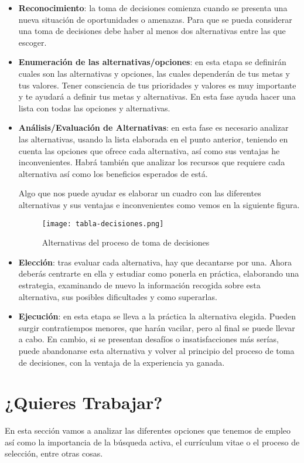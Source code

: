 \begin{itemize}
    \item \textbf{Reconocimiento}: la toma de decisiones comienza cuando se presenta una nueva situación de oportunidades o amenazas. Para que se pueda considerar una toma de decisiones debe haber al menos dos alternativas entre las que escoger.
    \item \textbf{Enumeración de las alternativas/opciones}: en esta etapa se definirán cuales son las alternativas y opciones, las cuales dependerán de tus metas y tus valores. Tener consciencia de tus prioridades y valores es muy importante y te ayudará a definir tus metas y alternativas. En esta fase ayuda hacer una lista con todas las opciones y alternativas.
    \item \textbf{Análisis/Evaluación de Alternativas}: en esta fase es necesario analizar las alternativas, usando la lista elaborada en el punto anterior, teniendo en cuenta las opciones que ofrece cada alternativa, así como sus ventajas he inconvenientes. Habrá también que analizar los recursos que requiere cada alternativa así como los beneficios esperados de está.

    Algo que nos puede ayudar es elaborar un cuadro con las diferentes alternativas y sus ventajas e inconvenientes como vemos en la siguiente figura.

    \begin{figure}[ht]
        \centering
        \texttt{[image: tabla-decisiones.png]}
        \caption{Alternativas del proceso de toma de decisiones}
    \end{figure}

    \item \textbf{Elección}: tras evaluar cada alternativa, hay que decantarse por una. Ahora deberás centrarte en ella y estudiar como ponerla en práctica, elaborando una estrategia, examinando de nuevo la información recogida sobre esta alternativa, sus posibles dificultades y como superarlas.
    \item \textbf{Ejecución}: en esta etapa se lleva a la práctica la alternativa elegida. Pueden surgir contratiempos menores, que harán vacilar, pero al final se puede llevar a cabo. En cambio, si se presentan desafíos o insatisfacciones más serías, puede abandonarse esta alternativa y volver al principio del proceso de toma de decisiones, con la ventaja de la experiencia ya ganada.
\end{itemize}

\section{¿Quieres Trabajar?}
En esta sección vamos a analizar las diferentes opciones que tenemos de empleo así como la importancia de la búsqueda activa, el currículum vitae o el proceso de selección, entre otras cosas.

